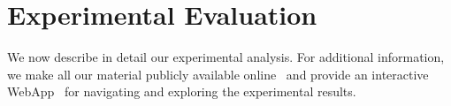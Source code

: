 \section{Experimental Evaluation}
\label{sec:exp}

We now describe in detail our experimental analysis. For additional information, we make all our material publicly available online~\cite{ourcode} and provide an interactive WebApp~\cite{ourwebsite} for navigating and exploring the experimental results.
 

\label{exp:setup}

